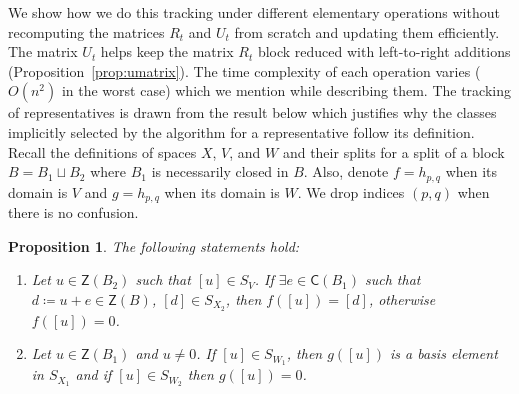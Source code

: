 \documentclass[letterpaper,11pt]{article}
\theoremstyle{plain}
\newtheorem{proposition}[theorem]{Proposition}
\theoremstyle{definition}
\newcounter{li}
\newcommand{\Zgroup}{\mathsf{Z}}
\newcommand{\Cgroup}{\mathsf{C}}
\newcommand{\bl}{B}
\begin{document}
We show how we do this tracking under different elementary operations without recomputing the matrices $R_t$ and $U_t$ from scratch and updating them efficiently. 
The matrix $U_t$ helps keep the matrix $R_t$ block reduced with left-to-right additions (Proposition~\ref{prop:umatrix}). The time complexity of each operation varies ($O(n^2)$ in the worst case)
which we mention while describing them.
The tracking of representatives is
drawn from the result below which justifies why the classes implicitly selected
by the algorithm for a representative follow its definition. 
Recall the definitions
    of spaces 
    $X$, $V$, and $W$ and their splits
for a split of a block $\bl=\bl_1\sqcup \bl_2$ where $\bl_1$
is necessarily closed in $\bl$. 
Also, denote $f=h_{p,q}$ when its domain is $V$ and $g=h_{p,q}$ when its domain is $W$. We drop indices $(p,q)$ when there is no confusion.
\begin{proposition}\label{prop:reversing-the-split-map}
    The following statements hold:
    \begin{enumerate}[label=\arabic*)]
        \item\label{it:reversing-the-split-map-B2}
            Let $u\in \Zgroup(B_2)$ such that $[u]\in S_{V}$.
            If $\exists e\in\Cgroup(B_1)$ such that $d\coloneqq u+e\in\Zgroup(B)$,
            $[d]\in S_{X_2}$, %
            then $f([u])=[d]$, otherwise $f([u])=0$.
        \item\label{it:reversing-the-split-map-B1} 
            Let $u\in \Zgroup(B_1)$ and $u\not=0$. If $[u]\in S_{W_1}$,
            then $g([u])$ is a basis element in $S_{X_1}$ and if $[u]\in S_{W_2}$ then
            $g([u])=0$.
    \end{enumerate}
\end{proposition}
\end{document}
